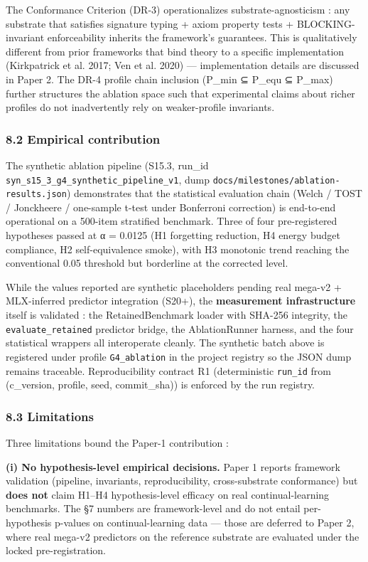 \documentclass[
]{article}
\begin{document}
The Conformance Criterion (DR-3) operationalizes substrate-agnosticism :
any substrate that satisfies signature typing + axiom property tests +
BLOCKING-invariant enforceability inherits the framework's guarantees.
This is qualitatively different from prior frameworks that bind theory
to a specific implementation ({Kirkpatrick et al.} 2017; Ven et al.
2020) --- implementation details are discussed in Paper 2. The DR-4
profile chain inclusion (P\_min ⊆ P\_equ ⊆ P\_max) further structures
the ablation space such that experimental claims about richer profiles
do not inadvertently rely on weaker-profile invariants.

\subsubsection{8.2 Empirical contribution}\label{empirical-contribution}

The synthetic ablation pipeline (S15.3, run\_id
\texttt{syn\_s15\_3\_g4\_synthetic\_pipeline\_v1}, dump
\texttt{docs/milestones/ablation-results.json}) demonstrates that the
statistical evaluation chain (Welch / TOST / Jonckheere / one-sample
t-test under Bonferroni correction) is end-to-end operational on a
500-item stratified benchmark. Three of four pre-registered hypotheses
passed at α = 0.0125 (H1 forgetting reduction, H4 energy budget
compliance, H2 self-equivalence smoke), with H3 monotonic trend reaching
the conventional 0.05 threshold but borderline at the corrected level.

While the values reported are synthetic placeholders pending real
mega-v2 + MLX-inferred predictor integration (S20+), the
\textbf{measurement infrastructure} itself is validated : the
RetainedBenchmark loader with SHA-256 integrity, the
\texttt{evaluate\_retained} predictor bridge, the AblationRunner
harness, and the four statistical wrappers all interoperate cleanly. The
synthetic batch above is registered under profile \texttt{G4\_ablation}
in the project registry so the JSON dump remains traceable.
Reproducibility contract R1 (deterministic \texttt{run\_id} from
(c\_version, profile, seed, commit\_sha)) is enforced by the run
registry.

\subsubsection{8.3 Limitations}\label{limitations}

Three limitations bound the Paper-1 contribution :

\textbf{(i) No hypothesis-level empirical decisions.} Paper 1 reports
framework validation (pipeline, invariants, reproducibility,
cross-substrate conformance) but \textbf{does not} claim H1--H4
hypothesis-level efficacy on real continual-learning benchmarks. The §7
numbers are framework-level and do not entail per-hypothesis p-values on
continual-learning data --- those are deferred to Paper 2, where real
mega-v2 predictors on the reference substrate are evaluated under the
locked pre-registration.
\end{document}

